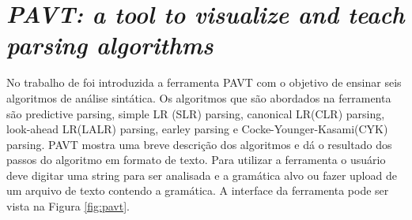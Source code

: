 
\section{\textit{PAVT: a tool to visualize and teach parsing algorithms}}
No trabalho de \textcite{sangal2018pavt} foi introduzida a ferramenta PAVT com o objetivo de ensinar seis algoritmos de análise sintática. Os algoritmos que são abordados na ferramenta são predictive parsing, simple LR (SLR) parsing, canonical LR(CLR) parsing, look-ahead LR(LALR) parsing, earley parsing e Cocke-Younger-Kasami(CYK) parsing. PAVT mostra uma breve descrição dos algoritmos e dá o resultado dos passos do algoritmo em formato de texto. Para utilizar a ferramenta o usuário deve digitar uma string para ser analisada e a gramática alvo ou fazer upload de um arquivo de texto contendo a gramática. A interface da ferramenta pode ser vista na Figura \ref{fig:pavt}.
\begin{figure}[h]
    \captionsetup{width=16cm}
\end{figure}

